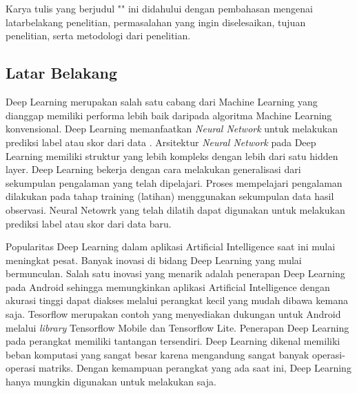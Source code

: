 \chapter{\babSatu}
Karya tulis yang berjudul "\judul" ini didahului dengan pembahasan mengenai latarbelakang penelitian, permasalahan yang ingin diselesaikan, tujuan penelitian, serta metodologi dari penelitian.

\section{Latar Belakang}
Deep Learning merupakan salah satu cabang dari Machine Learning yang dianggap memiliki performa lebih baik daripada algoritma Machine Learning konvensional. Deep Learning memanfaatkan \textit{Neural Network} untuk melakukan prediksi label atau skor dari data \cite{deeplearning}. Arsitektur \textit{Neural Network} pada Deep Learning memiliki struktur yang lebih kompleks dengan lebih dari satu hidden layer. Deep Learning bekerja dengan cara melakukan generalisasi dari sekumpulan pengalaman yang telah dipelajari. Proses mempelajari pengalaman dilakukan pada tahap training (latihan) menggunakan sekumpulan data hasil observasi. Neural Netowrk yang telah dilatih dapat digunakan untuk melakukan prediksi label atau skor dari data baru. 

Popularitas Deep Learning dalam aplikasi Artificial Intelligence saat ini mulai meningkat pesat. Banyak inovasi di bidang Deep Learning yang mulai bermunculan. Salah satu inovasi yang menarik adalah penerapan Deep Learning pada Android sehingga memungkinkan aplikasi Artificial Intelligence dengan akurasi tinggi dapat diakses melalui perangkat kecil yang mudah dibawa kemana saja. Tesorflow \cite{tensorflow} merupakan contoh \deeplearning \framework yang menyediakan dukungan untuk Android melalui \textit{library} Tensorflow Mobile dan Tensorflow Lite. Penerapan Deep Learning pada perangkat \mobile memiliki tantangan tersendiri. Deep Learning dikenal memiliki beban komputasi yang sangat besar karena mengandung sangat banyak operasi-operasi matriks. Dengan kemampuan perangkat \mobile yang ada saat ini, Deep Learning hanya mungkin digunakan untuk melakukan \inference saja. 

